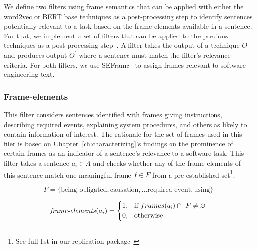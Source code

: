 We define two filters using frame semantics that can be
applied with either the word2vec or BERT base techniques as
 a post-processing step to identify sentences potentially relevant to a task based on the frame elements available in a sentence.
For that, we implement a set of filters that can be applied to the previous techniques as a post-processing step~\cite{Manning2009IR}.
A filter takes the output of a technique $O$ and produces output $O^{\prime}$ where a sentence must match the filter's relevance criteria. For both filters, we use SEFrame~\cite{marques2021} to assign frames relevant to
software engineering text.





\subsubsection{Frame-elements}

This filter considers sentences identified with
frames giving instructions, describing required events, explaining system procedures, and others as
 likely to contain information of interest. The rationale for
 the set of frames used in this filer is based on Chapter~\ref{ch:characterizing}'s findings on the prominence of certain frames as an indicator of a sentence's relevance to a software task.
This filter takes a sentence $a_i \in A$ and checks whether any of the frame elements
of this sentence match one meaningful frame $f \in F$ from a pre-established set\footnote{See full list in our replication package~\cite{dsandroid}}. 

\begin{small}
\begin{equation}
F = \{ \text{being obligated}, \text{causation}, \dots \text{required event}, \text{using} \} 
\end{equation}

\begin{equation}
\text{\textit{frame-elements}}(a_i) = \left \{
\begin{aligned}
    &1, && \text{if}\ frames(a_i) \cap ~F \ne \emptyset \\
    &0, && \text{otherwise}
\end{aligned} \right.
\end{equation} 
\end{small}


